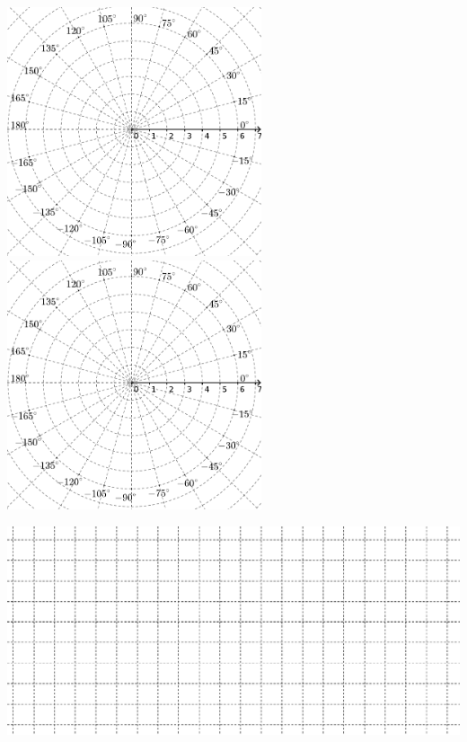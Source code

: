 \documentclass[12pt,a4paper]{article}
\begin{document}
\newpage
\restoregeometry
\begin{multicols}{2}
\includegraphics[width=7.5cm]{img/prova-4-civ-malha-1}
\vspace{2em}
\includegraphics[width=7.5cm]{img/prova-4-civ-malha-1}
\end{multicols}
\includegraphics[width=16cm]{img/prova-4-civ-malha-2}
\end{document}
